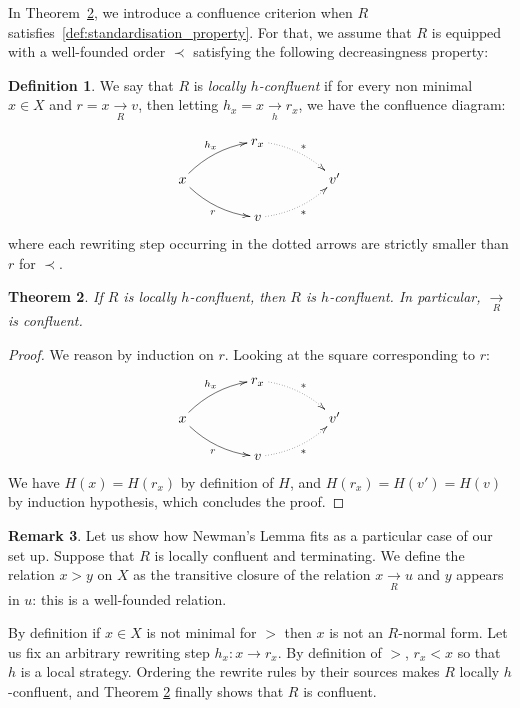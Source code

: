 \documentclass[10pt]{easychair}
\newtheorem{theorem}{Theorem}[section]
\theoremstyle{definition}
\newtheorem{definition}[theorem]{Definition}
\newtheorem{remark}[theorem]{Remark}
\newcommand\rewR{\underset{R}{\longrightarrow}}
\newcommand\rewh{\underset{h}{\longrightarrow}}
\begin{document}
In Theorem~\ref{thm:confluence_criterion}, we introduce a confluence
criterion when $R$ satisfies~\ref{def:standardisation_property}. For
that, we assume that $R$ is equipped with a well-founded order $\prec$
satisfying the following decreasingness property:

\begin{definition}\label{proper:decreasingness_property}
  We say that $R$ is \emph{locally $h$-confluent} if for every non
  minimal $x\in X$ and $r=x\rewR v$, then letting $h_x=x\rewh r_x$, we
  have the confluence diagram:
  
  \[
    \xymatrix @C = 4em @R = 1.5em{
      &
      r_x
      \ar@{.>}@/^/ [rd] ^{*}
      & \\
      x
      \ar@/^/ [ru] ^{h_x}
      \ar@/_/ [rd] _{r}
      &
      &
      v'
      \\
      &
      v
      \ar@{.>}@/_/  [ru] _{*}
      &
    }
  \]
  where each rewriting step occurring in the dotted arrows are strictly
  smaller than $r$ for $\prec$.
\end{definition}

\begin{theorem}\label{thm:confluence_criterion}
  If $R$ is locally $h$-confluent, then $R$ is $h$-confluent. In particular, $\rewR$ is confluent.
\end{theorem}

\begin{proof}
 We reason by induction on $r$. Looking at the square corresponding to $r$:
    \[
    \xymatrix @C = 4em @R = 1.5em{
      &
      r_x
      \ar@{.>}@/^/ [rd] ^{*}
      & \\
      x
      \ar@/^/ [ru] ^{h_x}
      \ar@/_/ [rd] _{r}
      &
      &
      v'
      \\
      &
      v
      \ar@{.>}@/_/  [ru] _{*}
      &
    }
  \]
  We have $H(x) = H(r_x)$ by definition of $H$, and $H(r_x) = H(v') = H(v)$ by induction hypothesis, which concludes the proof.
\end{proof}

\begin{remark}
Let us show how Newman's Lemma fits as a particular case of our set up. 
Suppose that $R$ is locally confluent and terminating. We define the relation $x > y$ on $X$ as the transitive closure of the relation $x \rewR u$ and $y$ appears in $u$: this is a well-founded relation. 

By definition if $x \in X$ is not minimal for $>$ then $x$ is not an $R$-normal form. Let us fix an arbitrary rewriting step $h_x: x \to r_x$.  By definition of $>$, $r_x < x$ so that $h$ is a local strategy. Ordering the rewrite rules by their sources makes $R$ locally $h$-confluent, and Theorem \ref{thm:confluence_criterion} finally shows that $R$ is confluent.  
\end{remark}
\end{document}
